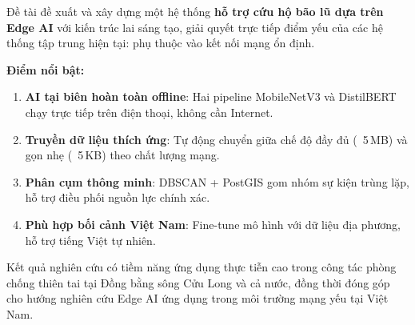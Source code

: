 \documentclass[12pt, a4paper]{report}
\newcommand{\keyword}[1]{\textbf{#1}}
\begin{document}
Đề tài đề xuất và xây dựng một hệ thống \keyword{hỗ trợ cứu hộ bão lũ dựa trên Edge AI} với kiến trúc lai sáng tạo, giải quyết trực tiếp điểm yếu của các hệ thống tập trung hiện tại: phụ thuộc vào kết nối mạng ổn định.

\textbf{Điểm nổi bật:}
\begin{enumerate}
  \item \keyword{AI tại biên hoàn toàn offline}: Hai pipeline MobileNetV3 và DistilBERT chạy trực tiếp trên điện thoại, không cần Internet.
  \item \keyword{Truyền dữ liệu thích ứng}: Tự động chuyển giữa chế độ đầy đủ (~5\,MB) và gọn nhẹ (~5\,KB) theo chất lượng mạng.
  \item \keyword{Phân cụm thông minh}: DBSCAN + PostGIS gom nhóm sự kiện trùng lặp, hỗ trợ điều phối nguồn lực chính xác.
  \item \keyword{Phù hợp bối cảnh Việt Nam}: Fine-tune mô hình với dữ liệu địa phương, hỗ trợ tiếng Việt tự nhiên.
\end{enumerate}

Kết quả nghiên cứu có tiềm năng ứng dụng thực tiễn cao trong công tác phòng chống thiên tai tại Đồng bằng sông Cửu Long và cả nước, đồng thời đóng góp cho hướng nghiên cứu Edge AI ứng dụng trong môi trường mạng yếu tại Việt Nam.
\end{document}
